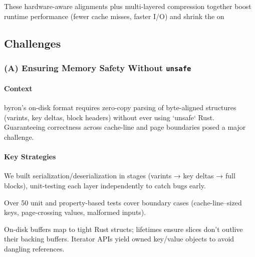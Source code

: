 \documentclass[10pt]{article}
\begin{document}

These hardware-aware alignments plus multi-layered compression together boost runtime performance (fewer cache misses, faster I/O) and shrink the on

\subsection{Challenges}

\subsubsection*{(A) Ensuring Memory Safety Without \texttt{unsafe}}

\paragraph{Context}
byron’s on-disk format requires zero-copy parsing of byte-aligned structures (varints, key deltas, block headers) without ever using `unsafe` Rust. Guaranteeing correctness across cache-line and page boundaries posed a major challenge.

\paragraph{Key Strategies}
\begin{description}[leftmargin=1em,labelwidth=*,itemsep=0.5ex]
  \item[Layered Verification] We built serialization/deserialization in stages (varints → key deltas → full blocks), unit-testing each layer independently to catch bugs early.
  \item[Extensive Test Suite] Over 50 unit and property-based tests cover boundary cases (cache-line–sized keys, page-crossing values, malformed inputs).
  \item[Rust Type \& Lifetime Safety] On-disk buffers map to tight Rust structs; lifetimes ensure slices don’t outlive their backing buffers. Iterator APIs yield owned key/value objects to avoid dangling references.
\end{description}
\end{document}
